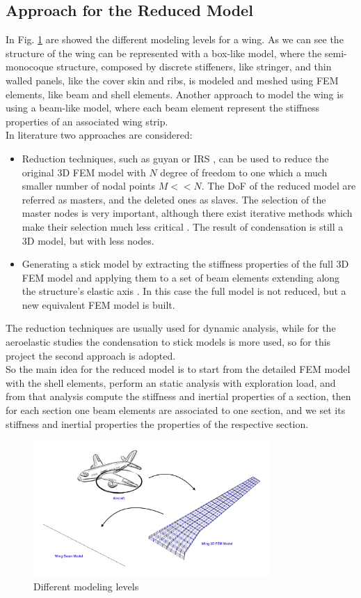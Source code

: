 \subsection{Approach for the Reduced Model}
In Fig. \ref{fig:4_1} are showed the different modeling levels for a wing. As we can see the structure of the wing can be represented with a box-like model, where the semi-monocoque structure, composed by discrete stiffeners, like stringer, and thin walled panels, like the cover skin and ribs, is modeled and meshed using FEM elements, like beam and shell elements. Another approach to model the wing is using a beam-like model, where each beam element represent the stiffness properties of an associated wing strip. \\
In literature two approaches are considered:
\begin{itemize}
	\item Reduction techniques, such as guyan or IRS \cite{don}, can be used to reduce the original 3D FEM model with $N$ degree of freedom to one which a much smaller number of nodal points $M < < N$. The DoF of the reduced model are referred as masters, and the deleted ones as slaves. The selection of the master nodes is very important, although there exist iterative methods which make their selection much less critical \cite{qui}. The result of condensation is still a 3D model, but with less nodes.
	\item Generating a stick model by extracting the stiffness properties of the full 3D FEM model and applying them to a set of beam elements extending along the structure’s elastic axis \cite{ite}. In this case the full model is not reduced, but a new equivalent FEM model is built.
\end{itemize}
The reduction techniques are usually used for dynamic analysis, while for the aeroelastic studies the condensation to stick models is more used, so for this project the second approach is adopted.\\
So the main idea for the reduced model is to start from the detailed FEM model with the shell elements, perform an static analysis with exploration load, and from that analysis compute the stiffness and inertial properties of a section, then for each section one beam elements are associated to one section, and we set its stiffness and inertial properties the properties of the respective section.\\

\begin{figure}[H]
	\centering
	\includegraphics[width = 0.8\textwidth]{./Immagini/4_1.png}
	\caption{Different modeling levels }
	\label{fig:4_1}
\end{figure}
